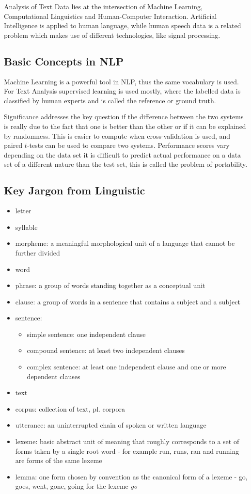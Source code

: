 \documentclass[11pt]{article}
\begin{document}
Analysis of Text Data lies at the intersection of Machine Learning, Computational Linguistics and Human-Computer Interaction. Artificial Intelligence is applied to human language, while human speech data is a related problem which makes use of different technologies, like signal processing.

\subsection{Basic Concepts in NLP}
Machine Learning is a powerful tool in NLP, thus the same vocabulary is used. For Text Analysis supervised learning is used mostly, where the labelled data is classified by human experts and is called the reference or ground truth.

Significance addresses the key question if the difference between the two systems is really due to the fact that one is better than the other or if it can be explained by randomness. This is easier to compute when cross-validation is used, and paired $t$-tests can be used to compare two systems. Performance scores vary depending on the data set it is difficult to predict actual performance on a data set of a different
nature than the test set, this is called the problem of portability.

\subsection{Key Jargon from Linguistic}
\begin{itemize}
	\item letter
	\item syllable
	\item morpheme: a meaningful morphological unit of a language that cannot be further divided
	\item word
	\item phrase: a group of words standing together as a conceptual unit
	\item clause: a group of words in a sentence that contains a subject and a subject
	\item sentence:
	\begin{itemize}
		\item simple sentence: one independent clause
		\item compound sentence: at least two independent clauses
		\item complex sentence: at least one independent clause and one or more dependent clauses
	\end{itemize}
	\item text
	\item corpus: collection of text, pl. corpora
	\item utterance: an uninterrupted chain of spoken or written language
	\item lexeme: basic abstract unit of meaning that roughly corresponds to a set of forms taken by a single root word - for example run, runs, ran and running are forms of the same lexeme
	\item lemma:  one form chosen by convention as the canonical form of a lexeme - go, goes, went, gone, going for the lexeme \emph{go}
\end{itemize}
\end{document}
